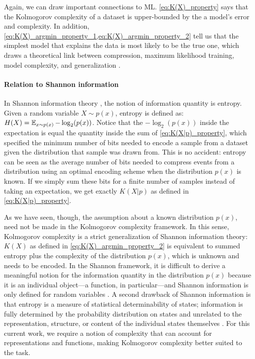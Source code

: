 \documentclass{article} %
\begin{document}
\begin{appendices}
Again, we can draw important connections to ML. \cref{eq:K(X)_property} says that the Kolmogorov complexity of a dataset is upper-bounded by the a model's error and complexity. In addition, \cref{eq:K(X)_argmin_property_1,eq:K(X)_argmin_property_2} tell us that the simplest model that explains the data is most likely to be the true one, which draws a theoretical link between compression, maximum likelihood training, model complexity, and generalization \citep{goldblum2023no}.

\paragraph{Relation to Shannon information}

In Shannon information theory \citep{shannon2001mathematical}, the notion of information quantity is entropy. Given a random variable $X \sim p(x)$, entropy is defined as: $H(X) = \operatorname*{\mathbb{E}}_{x \sim p(x)} -\log_2(p(x))$. Notice that the $-\log_2(p(x))$ inside the expectation is equal the quantity inside the sum of \cref{eq:K(X|p)_property}, which specified the minimum number of bits needed to encode a sample from a dataset given the distribution that sample was drawn from. This is no accident: entropy can be seen as the average number of bits needed to compress events from a distribution using an optimal encoding scheme when the distribution $p(x)$ is known. If we simply sum these bits for a finite number of samples instead of taking an expectation, we get exactly $K(X|p)$ as defined in \cref{eq:K(X|p)_property}.

As we have seen, though, the assumption about a known distribution $p(x)$, need not be made in the Kolmogorov complexity framework. In this sense, Kolmogorov complexity is a strict generalization of Shannon information theory: $K(X)$ as defined in \cref{eq:K(X)_argmin_property_2} is equivalent to summed entropy plus the complexity of the distribution $p(x)$, which is unknown and needs to be encoded. In the Shannon framework, it is difficult to derive a meaningful notion for the information quantity in the distribution $p(x)$ because it is an individual object---a function, in particular---and Shannon information is only defined for random variables \citep{grunwald2003kolmogorov}. A second drawback of Shannon information is that entropy is a measure of statistical determinability of states; information is fully determined by the probability distribution on states and unrelated to the representation, structure, or content of the individual states themselves \citep{grunwald2003kolmogorov}. For this current work, we require a notion of complexity that can account for representations and functions, making Kolmogorov complexity better suited to the task.



\end{appendices}
\end{document}
